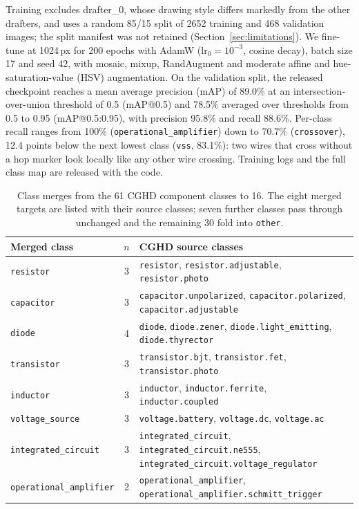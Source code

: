 \documentclass{ieeeaccess}
\begin{document}
Training excludes drafter\_0, whose drawing style differs markedly from the other drafters, and uses a random 85/15 split of 2652 training and 468 validation images; the split manifest was not retained (Section~\ref{sec:limitations}). We fine-tune at 1024\,px for 200 epochs with AdamW ($\text{lr}_0=10^{-3}$, cosine decay), batch size 17 and seed 42, with mosaic, mixup, RandAugment and moderate affine and hue-saturation-value (HSV) augmentation. On the validation split, the released checkpoint reaches a mean average precision (mAP) of 89.0\% at an intersection-over-union threshold of 0.5 (mAP@0.5) and 78.5\% averaged over thresholds from 0.5 to 0.95 (mAP@0.5:0.95), with precision 95.8\% and recall 88.6\%. Per-class recall ranges from 100\% (\texttt{operational\_amplifier}) down to 70.7\% (\texttt{crossover}), 12.4 points below the next lowest class (\texttt{vss}, 83.1\%): two wires that cross without a hop marker look locally like any other wire crossing. Training logs and the full class map are released with the code.

\begin{table}[t]
\caption{Class merges from the 61 CGHD component classes to 16. The eight merged targets are listed with their source classes; seven further classes pass through unchanged and the remaining 30 fold into \texttt{other}.}
\label{tab:class_merge}
\centering
\footnotesize
\setlength{\tabcolsep}{4pt}
\begin{tabular}{@{}lcl@{}}
\toprule
\textbf{Merged class} & $n$ & \textbf{CGHD source classes} \\
\midrule
\texttt{resistor} & 3 & \texttt{resistor}, \texttt{resistor.adjustable}, \texttt{resistor.photo} \\
\texttt{capacitor} & 3 & \texttt{capacitor.unpolarized}, \texttt{capacitor.polarized}, \texttt{capacitor.adjustable} \\
\texttt{diode} & 4 & \texttt{diode}, \texttt{diode.zener}, \texttt{diode.light\_emitting}, \texttt{diode.thyrector} \\
\texttt{transistor} & 3 & \texttt{transistor.bjt}, \texttt{transistor.fet}, \texttt{transistor.photo} \\
\texttt{inductor} & 3 & \texttt{inductor}, \texttt{inductor.ferrite}, \texttt{inductor.coupled} \\
\texttt{voltage\_source} & 3 & \texttt{voltage.battery}, \texttt{voltage.dc}, \texttt{voltage.ac} \\
\texttt{integrated\_circuit} & 3 & \texttt{integrated\_circuit}, \texttt{integrated\_circuit.ne555}, \texttt{integrated\_circuit.voltage\_regulator} \\
\texttt{operational\_amplifier} & 2 & \texttt{operational\_amplifier}, \texttt{operational\_amplifier.schmitt\_trigger} \\
\bottomrule
\end{tabular}
\end{table}
\end{document}
